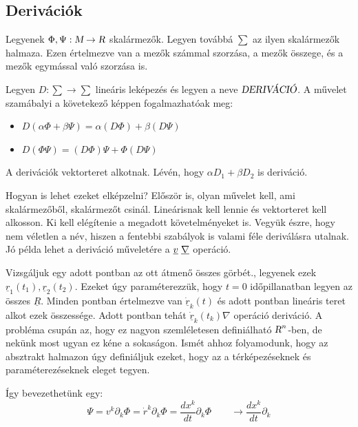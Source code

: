 \documentclass[a4paper,12pt]{article}
\begin{document}
\subsection{ Derivációk}
\par Legyenek $\Phi, \Psi : \textsl{M} \rightarrow \textsl{R}$ skalármezők. Legyen továbbá $\sum$ az ilyen skalármezők halmaza. Ezen értelmezve van a mezők számmal szorzása, a mezők összege, és a mezők egymással való szorzása is.
\par Legyen $D : \sum \rightarrow \sum$ lineáris leképezés és legyen a neve $\textsl{DERIVÁCIÓ}$. A művelet szamábalyi a követekező képpen fogalmazhatóak meg:
\begin{itemize}
\item $D(\alpha\Phi + \beta\Psi) = \alpha(D\Phi) + \beta(D\Psi)$
\item $D(\Phi\Psi) = (D\Phi)\Psi + \Phi(D\Psi)$
\end{itemize}
\par A derivációk vektorteret alkotnak. Lévén, hogy $\alpha D_1 + \beta D_2$ is deriváció.
\newline
\par Hogyan is lehet ezeket elképzelni? Először is, olyan művelet kell, ami skalármezőből, skalármezőt csinál. Lineárisnak kell lennie és vektorteret kell alkosson. Ki kell elégítenie a megadott követelményeket is. Vegyük észre, hogy nem véletlen a név, hiszen a fentebbi szabályok is valami féle deriválásra utalnak. Jó példa lehet a deriváció műveletére a $\underline{v}\hspace{0.1cm}\underline{\nabla}$ operáció. 
\par Vizsgáljuk egy adott pontban az ott átmenő összes görbét., legyenek ezek $\underline{r}_{1}(t_1), \underline{r}_{2}(t_2)$. Ezeket úgy paraméterezzük, hogy $t = 0$ időpillanatban legyen az összes $\underline{R}$. Minden pontban értelmezve van $\dot{\underline{r}}_{k}(t)$ és adott pontban lineáris teret alkot ezek összessége. Adott pontban tehát $\dot{\underline{r}}_{k}(t_k)\nabla$ operáció deriváció. A probléma csupán az, hogy ez nagyon szemléletesen definiálható $\textsl{R}^{n}$-ben, de nekünk most ugyan ez kéne a sokaságon. Ismét ahhoz folyamodunk, hogy az absztrakt halmazon úgy definiáljuk ezeket, hogy az a térképezéseknek és paraméterezéseknek eleget tegyen. 
\par Így bevezethetünk egy:
\begin{equation*}
    \Psi = v^{k}\partial_{k}\Phi = \dot{r}^{k}\partial_{k}\Phi = \frac{dx^{k}}{dt}\partial_k\Phi \quad \quad \rightarrow \frac{dx^{k}}{dt}\partial_{k}
\end{equation*}
\end{document}
